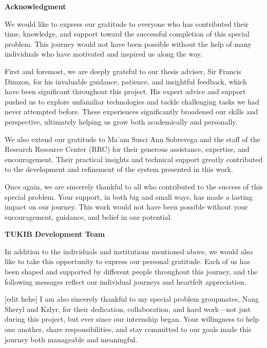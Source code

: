 \begin{center}
	\textbf{Acknowledgment}
\end{center}

We would like to express our gratitude to everyone who has contributed their time, knowledge, and support toward the successful completion of this special problem. This journey would not have been possible without the help of many individuals who have motivated and inspired us along the way.

First and foremost, we are deeply grateful to our thesis adviser, Sir Francis Dimzon, for his invaluable guidance, patience, and insightful feedback, which have been significant throughout this project. His expert advice and support pushed us to explore unfamiliar technologies and tackle challenging tasks we had never attempted before. These experiences significantly broadened our skills and perspective, ultimately helping us grow both academically and personally.

We also extend our gratitude to Ma’am Susci Ann Sobrevega and the staff of the Research Resource Center (RRC) for their generous assistance, expertise, and encouragement. Their practical insights and technical support greatly contributed to the development and refinement of the system presented in this work.

Once again, we are sincerely thankful to all who contributed to the success of this special problem. Your support, in both big and small ways, has made a lasting impact on our journey. This work would not have been possible without your encouragement, guidance, and belief in our potential.

\vspace{0.5em}
\hfill \textbf{TUKIB Development Team}

In addition to the individuals and institutions mentioned above, we would also like to take this opportunity to express our personal gratitude. Each of us has been shaped and supported by different people throughout this journey, and the following messages reflect our individual journeys and heartfelt appreciation.


[edit hehe]
I am also sincerely thankful to my special problem groupmates, Nang Sheryl and Kzlyr, for their dedication, collaboration, and hard work—not just during this project, but ever since our internship began. Your willingness to help one another, share responsibilities, and stay committed to our goals made this journey both manageable and meaningful.


